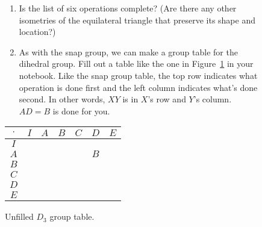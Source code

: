 \documentclass[../textbook.tex]{subfiles}
\begin{document}
\begin{figure}[h]
	\begin{center}
		\begin{minipage}[c]{0.55\textwidth}
			\begin{enumerate}
				\item Is the list of six operations complete? (Are there any other isometries of the equilateral triangle that preserve its shape and location?)
				\item As with the snap group, we can make a group table for the dihedral group. Fill out a table like the one in Figure~\ref{fig:sbstable} in your notebook. Like the snap group table, the top row indicates what operation is done first and the left column indicates what's done second. In other words, $XY$ is in $X$'s row and $Y$'s column. $AD=B$ is done for you.
			\end{enumerate}
		\end{minipage}
		\hfill
		\begin{minipage}[c]{0.35\textwidth}
			\begin{center}
				\begin{minipage}[b]{\textwidth}
					\centering
					\begin{tabular}{c|cccccc}
						\hline
						$\cdot$ & $I$ & $A$ & $B$ & $C$ & $D$ & $E$ \\ \hline
						\rowcolor{light-gray}
						$I$    &   &   &   &   &   &   \\
						$A$    &   &   &   &   & $B$  &   \\
						\rowcolor{light-gray}
						$B$    &   &   &   &   &   &   \\
						$C$    &   &   &   &   &   &   \\
						\rowcolor{light-gray}
						$D$    &   &   &   &   &   &   \\
						$E$    &   &   &   &   &   &   \\ \hline
					\end{tabular}
					\vspace*{0.5\baselineskip}
				\end{minipage}
			\end{center}
			\vspace*{-2\baselineskip}
			\begin{center}
				\begin{minipage}[t]{\textwidth}
					\caption{Unfilled $D_3$ group table.}
					\label{fig:sbstable}
				\end{minipage}
			\end{center}
		\end{minipage}
	\end{center}
	\vspace*{-2\baselineskip}
\end{figure}
\end{document}
